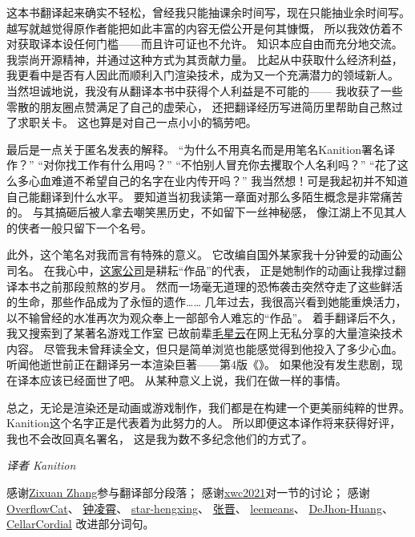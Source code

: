 这本书翻译起来确实不轻松，曾经我只能抽课余时间写，现在只能抽业余时间写。
越写就越觉得原作者能把如此丰富的内容无偿公开是何其慷慨，
所以我效仿着不对获取译本设任何门槛——而且许可证也不允许。
知识本应自由而充分地交流。我崇尚开源精神，并通过这种方式为其贡献力量。
比起从中获取什么经济利益，我更看中是否有人因此而顺利入门渲染技术，成为又一个充满潜力的领域新人。
当然坦诚地说，我没有从翻译本书中获得个人利益是不可能的——
我收获了一些零散的朋友圈点赞满足了自己的虚荣心，
还把翻译经历写进简历里帮助自己熬过了求职关卡。
这也算是对自己一点小小的犒劳吧。

最后是一点关于匿名发表的解释。
“为什么不用真名而是用笔名Kanition署名译作？”
“对你找工作有什么用吗？”
“不怕别人冒充你去攫取个人名利吗？”
“花了这么多心血难道不希望自己的名字在业内传开吗？”
我当然想！可是我起初并不知道自己能翻译到什么水平。
要知道当初我读第一章面对那么多陌生概念是非常痛苦的。
与其搞砸后被人拿去嘲笑黑历史，不如留下一丝神秘感，
像江湖上不见其人的侠者一般只留下一个名号。

此外，这个笔名对我而言有特殊的意义。
它改编自国外某家我十分钟爱的动画公司名。
在我心中，\href{https://www.kyotoanimation.co.jp/}{这家公司}是耕耘“作品”的代表，
正是她制作的动画让我撑过翻译本书之前那段煎熬的岁月。
然而一场毫无道理的恐怖袭击突然夺走了这些鲜活的生命，那些作品成为了永恒的遗作……
几年过去，我很高兴看到她能重焕活力，以不输曾经的水准再次为观众奉上一部部令人难忘的“作品”。
着手翻译后不久，我又搜索到了某著名游戏工作室
已故前辈\href{https://github.com/QianMo}{毛星云}在网上无私分享的大量渲染技术内容。
尽管我未曾拜读全文，但只是简单浏览也能感觉得到他投入了多少心血。
听闻他逝世前正在翻译另一本渲染巨著——第4版《》\citep{978-1138627000}。
如果他没有发生悲剧，现在译本应该已经面世了吧。
从某种意义上说，我们在做一样的事情。

总之，无论是渲染还是动画或游戏制作，我们都是在构建一个更美丽纯粹的世界。
Kanition这个名字正是代表着为此努力的人。
所以即便这本译作将来获得好评，我也不会改回真名署名，
这是我为数不多纪念他们的方式了。

\vspace{15pt}
{\hfill {\itshape 译者 Kanition}\qquad}

\vspace{15pt}

感谢\href{https://zixuan-zhang.com}{Zixuan Zhang}参与翻译部分段落；
感谢\href{https://github.com/xwc2021}{xwc2021}对一节的讨论；
感谢\href{https://github.com/OverflowCat}{OverflowCat}、
\href{https://www.zhihu.com/people/zhong-ling-xiao}{钟凌霄}、
\href{https://github.com/star-hengxing}{star-hengxing}、
\href{https://theigrams.github.io/}{张晋}、
\href{https://github.com/leemeans}{leemeans}、
\href{https://www.zhihu.com/people/itact/posts}{DeJhon-Huang}、
\href{https://github.com/CellarCordial}{CellarCordial}
改进部分词句。